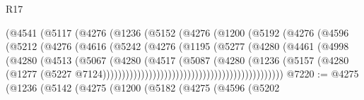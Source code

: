 \begin{lexlean}{R17}
\begin{coremodule}
                                  (@4541
                                    (@5117
                                      (@4276
                                        (@1236
                                          (@5152
                                            (@4276
                                              (@1200
                                                (@5192
                                                  (@4276
                                                    (@4596
                                                      (@5212
                                                        (@4276
                                                          (@4616
                                                            (@5242
                                                              (@4276
                                                                (@1195
                                                                  (@5277
                                                                    (@4280
                                                                      (@4461
                                                                        (@4998
                                                                          (@4280
                                                                            (@4513
                                                                              (@5067
                                                                                (@4280
                                                                                  (@4517
                                                                                    (@5087
                                                                                      (@4280
                                                                                        (@1236
                                                                                          (@5157
                                                                                            (@4280
                                                                                              (@1277
                                                                                                (@5227
                                                                                                  @7124)))))))))))))))))))))))))))))))))))))))))))))))
@7220 := @4275
    (@1236
      (@5142
        (@4275
          (@1200
            (@5182
              (@4275
                (@4596
                  (@5202

\end{coremodule}
\end{lexlean}
